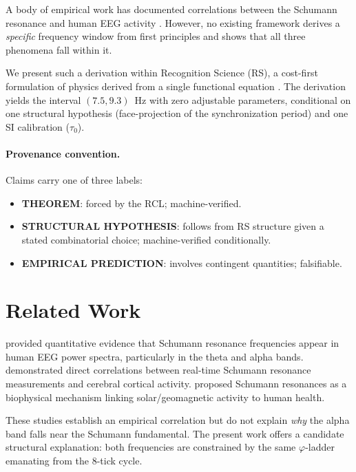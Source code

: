 \documentclass[11pt,a4paper]{article}
\begin{document}
A body of empirical work has documented correlations between the
Schumann resonance and human EEG activity
\citep{persinger2014,saroka2011,cherry2002}. However, no existing framework derives a
\emph{specific} frequency window from first principles and shows
that all three phenomena fall within it.

We present such a derivation within Recognition Science (RS), a
cost-first formulation of physics derived from a single functional
equation \citep{washburn2025axioms}. The derivation yields the
interval $(7.5,9.3)$~Hz with zero adjustable parameters, conditional
on one structural hypothesis (face-projection of the synchronization
period) and one SI calibration ($\tau_0$).

\paragraph{Provenance convention.} Claims carry one of three labels:
\begin{itemize}
  \item \textbf{THEOREM}: forced by the RCL; machine-verified.
  \item \textbf{STRUCTURAL HYPOTHESIS}: follows from RS structure
    given a stated combinatorial choice; machine-verified conditionally.
  \item \textbf{EMPIRICAL PREDICTION}: involves contingent quantities;
    falsifiable.
\end{itemize}

\section{Related Work}
\label{sec:related}

\citet{persinger2014} provided quantitative evidence that Schumann
resonance frequencies appear in human EEG power spectra, particularly
in the theta and alpha bands. \citet{saroka2011} demonstrated direct
correlations between real-time Schumann resonance measurements and
cerebral cortical activity. \citet{cherry2002} proposed Schumann
resonances as a biophysical mechanism linking solar/geomagnetic
activity to human health.

These studies establish an empirical correlation but do not explain
\emph{why} the alpha band falls near the Schumann fundamental. The
present work offers a candidate structural explanation: both
frequencies are constrained by the same $\varphi$-ladder emanating
from the 8-tick cycle.
\end{document}
